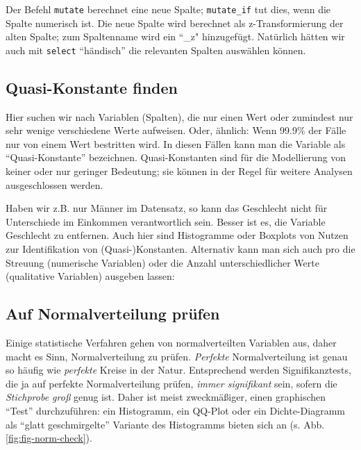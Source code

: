 \documentclass[12pt,ngerman,]{book}
\makeatletter
\newenvironment{Shaded}{\begin{snugshade}}{\end{snugshade}}
\newcommand{\KeywordTok}[1]{\textcolor[rgb]{0.13,0.29,0.53}{\textbf{{#1}}}}
\newcommand{\DataTypeTok}[1]{\textcolor[rgb]{0.13,0.29,0.53}{{#1}}}
\newcommand{\CommentTok}[1]{\textcolor[rgb]{0.56,0.35,0.01}{\textit{{#1}}}}
\newcommand{\OtherTok}[1]{\textcolor[rgb]{0.56,0.35,0.01}{{#1}}}
\newcommand{\NormalTok}[1]{{#1}}
\newenvironment{kframe}{%
\medskip{}
\setlength{\fboxsep}{.8em}
 \def\at@end@of@kframe{}%
 \ifinner\ifhmode%
  \def\at@end@of@kframe{\end{minipage}}%
  \begin{minipage}{\columnwidth}%
 \fi\fi%
 \def\FrameCommand##1{\hskip\@totalleftmargin \hskip-\fboxsep
 \colorbox{shadecolor}{##1}\hskip-\fboxsep
     \hskip-\linewidth \hskip-\@totalleftmargin \hskip\columnwidth}%
 \MakeFramed {\advance\hsize-\width
   \@totalleftmargin\z@ \linewidth\hsize
   \@setminipage}}%
 {\par\unskip\endMakeFramed%
 \at@end@of@kframe}
\renewenvironment{Shaded}{\begin{kframe}}{\end{kframe}}
\makeatother
\begin{document}
Der Befehl \texttt{mutate} berechnet eine neue Spalte;
\texttt{mutate\_if} tut dies, wenn die Spalte numerisch ist. Die neue
Spalte wird berechnet als z-Transformierung der alten Spalte; zum
Spaltenname wird ein ``\_z" hinzugefügt. Natürlich hätten wir auch mit
\texttt{select} ``händisch'' die relevanten Spalten auswählen können.

\subsection{Quasi-Konstante finden}\label{quasi-konstante-finden}

Hier suchen wir nach Variablen (Spalten), die nur einen Wert oder
zumindest nur sehr wenige verschiedene Werte aufweisen. Oder, ähnlich:
Wenn 99.9\% der Fälle nur von einem Wert bestritten wird. In diesen
Fällen kann man die Variable als ``Quasi-Konstante'' bezeichnen.
Quasi-Konstanten sind für die Modellierung von keiner oder nur geringer
Bedeutung; sie können in der Regel für weitere Analysen ausgeschlossen
werden.

Haben wir z.B. nur Männer im Datensatz, so kann das Geschlecht nicht für
Unterschiede im Einkommen verantwortlich sein. Besser ist es, die
Variable Geschlecht zu entfernen. Auch hier sind Histogramme oder
Boxplots von Nutzen zur Identifikation von (Quasi-)Konstanten.
Alternativ kann man sich auch pro die Streuung (numerische Variablen)
oder die Anzahl unterschiedlicher Werte (qualitative Variablen) ausgeben
lassen:

\begin{Shaded}
\end{Shaded}

\subsection{Auf Normalverteilung
prüfen}\label{auf-normalverteilung-prufen}

Einige statistische Verfahren gehen von normalverteilten Variablen aus,
daher macht es Sinn, Normalverteilung zu prüfen. \emph{Perfekte}
Normalverteilung ist genau so häufig wie \emph{perfekte} Kreise in der
Natur. Entsprechend werden Signifikanztests, die ja auf perfekte
Normalverteilung prüfen, \emph{immer signifikant} sein, sofern die
\emph{Stichprobe groß} genug ist. Daher ist meist zweckmäßiger, einen
graphischen ``Test'' durchzuführen: ein Histogramm, ein QQ-Plot oder ein
Dichte-Diagramm als ``glatt geschmirgelte'' Variante des Histogramms
bieten sich an (s. Abb. \ref{fig:fig-norm-check}).
\end{document}
